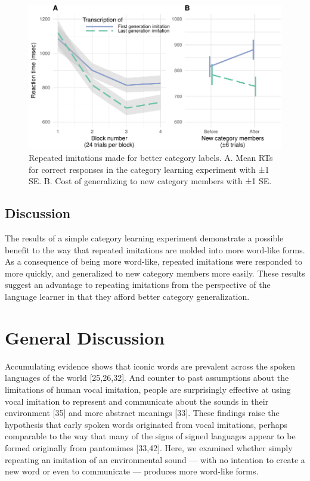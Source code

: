 \documentclass[english,floatsintext,man]{apa6}
\theoremstyle{definition}
\theoremstyle{definition}
\theoremstyle{definition}
\theoremstyle{remark}
\begin{document}
\begin{figure}
\centering
\includegraphics{fig4-1.pdf}
\caption{\label{fig:fig4}Repeated imitations made for better category
labels. A. Mean RTs for correct responses in the category learning
experiment with ±1 SE. B. Cost of generalizing to new category members
with ±1 SE.}
\end{figure}

\hypertarget{discussion-2}{%
\subsection{Discussion}\label{discussion-2}}

The results of a simple category learning experiment demonstrate a
possible benefit to the way that repeated imitations are molded into
more word-like forms. As a consequence of being more word-like, repeated
imitations were responded to more quickly, and generalized to new
category members more easily. These results suggest an advantage to
repeating imitations from the perspective of the language learner in
that they afford better category generalization.

\hypertarget{general-discussion}{%
\section{General Discussion}\label{general-discussion}}

Accumulating evidence shows that iconic words are prevalent across the
spoken languages of the world {[}25,26,32{]}. And counter to past
assumptions about the limitations of human vocal imitation, people are
surprisingly effective at using vocal imitation to represent and
communicate about the sounds in their environment {[}35{]} and more
abstract meanings {[}33{]}. These findings raise the hypothesis that
early spoken words originated from vocal imitations, perhaps comparable
to the way that many of the signs of signed languages appear to be
formed originally from pantomimes {[}33,42{]}. Here, we examined whether
simply repeating an imitation of an environmental sound --- with no
intention to create a new word or even to communicate --- produces more
word-like forms.
\end{document}

